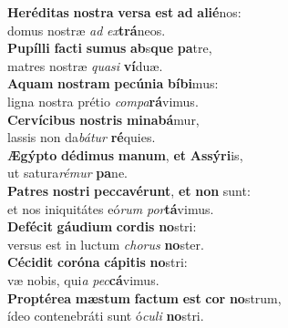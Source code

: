 \evenverse \textbf{He}\textbf{ré}\textbf{di}\textbf{tas} \textbf{no}\textbf{stra} \textbf{ver}\textbf{sa} \textbf{est} \textbf{ad} \textbf{a}\textbf{li}\textbf{é}nos:~\*\\
\evenverse domus nostræ \textit{ad} \textit{ex}\textbf{trá}neos.\\
\oddverse \textbf{Pu}\textbf{píl}\textbf{li} \textbf{fa}\textbf{cti} \textbf{su}\textbf{mus} \textbf{ab}s\textbf{que} \textbf{pa}tre,~\*\\
\oddverse matres nostræ \textit{qua}\textit{si} \textbf{ví}duæ.\\
\evenverse \textbf{A}\textbf{quam} \textbf{no}\textbf{stram} \textbf{pe}\textbf{cú}\textbf{ni}\textbf{a} \textbf{bí}\textbf{bi}mus:~\*\\
\evenverse ligna nostra prétio \textit{com}\textit{pa}\textbf{rá}vimus.\\
\oddverse \textbf{Cer}\textbf{ví}\textbf{ci}\textbf{bus} \textbf{no}\textbf{stris} \textbf{mi}\textbf{na}\textbf{bá}mur,~\*\\
\oddverse lassis non da\textit{bá}\textit{tur} \textbf{ré}quies.\\
\evenverse \textbf{Æ}\textbf{gýp}\textbf{to} \textbf{dé}\textbf{di}\textbf{mus} \textbf{ma}\textbf{num}, \textbf{et} \textbf{As}\textbf{sý}\textbf{ri}is,~\*\\
\evenverse ut satura\textit{ré}\textit{mur} \textbf{pa}ne.\\
\oddverse \textbf{Pa}\textbf{tres} \textbf{no}\textbf{stri} \textbf{pec}\textbf{ca}\textbf{vé}\textbf{runt}, \textbf{et} \textbf{non} sunt:~\*\\
\oddverse et nos iniquitátes eó\textit{rum} \textit{por}\textbf{tá}vimus.\\
\evenverse \textbf{De}\textbf{fé}\textbf{cit} \textbf{gáu}\textbf{di}\textbf{um} \textbf{cor}\textbf{dis} \textbf{no}stri:~\*\\
\evenverse versus est in luctum \textit{cho}\textit{rus} \textbf{no}ster.\\
\oddverse \textbf{Cé}\textbf{ci}\textbf{dit} \textbf{co}\textbf{ró}\textbf{na} \textbf{cá}\textbf{pi}\textbf{tis} \textbf{no}stri:~\*\\
\oddverse væ nobis, qui\textit{a} \textit{pec}\textbf{cá}vimus.\\
\evenverse \textbf{Prop}\textbf{té}\textbf{re}\textbf{a} \textbf{mæ}\textbf{stum} \textbf{fa}\textbf{ctum} \textbf{est} \textbf{cor} \textbf{no}strum,~\*\\
\evenverse ídeo contenebráti sunt ó\textit{cu}\textit{li} \textbf{no}stri.\\
